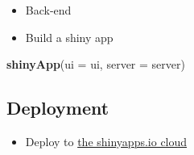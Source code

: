 \documentclass[
]{book}
\newenvironment{Shaded}{\begin{snugshade}}{\end{snugshade}}
\newcommand{\AttributeTok}[1]{\textcolor[rgb]{0.13,0.29,0.53}{#1}}
\newcommand{\ControlFlowTok}[1]{\textcolor[rgb]{0.13,0.29,0.53}{\textbf{#1}}}
\newcommand{\FunctionTok}[1]{\textcolor[rgb]{0.13,0.29,0.53}{\textbf{#1}}}
\newcommand{\NormalTok}[1]{#1}
\newcommand{\OtherTok}[1]{\textcolor[rgb]{0.56,0.35,0.01}{#1}}
\newcommand{\SpecialCharTok}[1]{\textcolor[rgb]{0.81,0.36,0.00}{\textbf{#1}}}
\newcommand{\StringTok}[1]{\textcolor[rgb]{0.31,0.60,0.02}{#1}}
\providecommand{\tightlist}{%
  \setlength{\itemsep}{0pt}\setlength{\parskip}{0pt}}
\begin{document}
\begin{itemize}
\tightlist
\item
  Back-end
\end{itemize}

\begin{Shaded}
\end{Shaded}

\begin{itemize}
\tightlist
\item
  Build a shiny app
\end{itemize}

\begin{Shaded}
\begin{Highlighting}[]
\FunctionTok{shinyApp}\NormalTok{(}\AttributeTok{ui =}\NormalTok{ ui, }\AttributeTok{server =}\NormalTok{ server)}
\end{Highlighting}
\end{Shaded}

\subsection{Deployment}\label{deployment}

\begin{itemize}
\tightlist
\item
  Deploy to \href{https://www.shinyapps.io/?_ga=2.5503866.871102833.1602978469-100003412.1602392815}{the shinyapps.io cloud}
\end{itemize}
\end{document}
